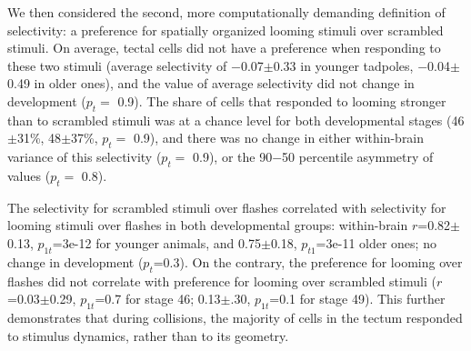 \documentclass{article}
\begin{document}
We then considered the second, more computationally demanding definition of selectivity: a preference for spatially organized looming stimuli over scrambled stimuli. On average, tectal cells did not have a preference when responding to these two stimuli (average selectivity of $-$0.07$\pm$0.33 in younger tadpoles, $-$0.04$\pm$0.49 in older ones), and the value of average selectivity did not change in development ($p_t=$ 0.9). The share of cells that responded to looming stronger than to scrambled stimuli was at a chance level for both developmental stages (46$\pm$31\%, 48$\pm$37\%, $p_t=$ 0.9), and there was no change in either within-brain variance of this selectivity ($p_t=$ 0.9), or the 90$-$50 percentile asymmetry of values ($p_t=$ 0.8).

The selectivity for scrambled stimuli over flashes correlated with selectivity for looming stimuli over flashes in both developmental groups: within-brain $r$=0.82$\pm$0.13, $p_{1t}$=3e-12 for younger animals, and 0.75$\pm$0.18, $p_{t1}$=3e-11 older ones; no change in development ($p_t$=0.3). On the contrary, the preference for looming over flashes did not correlate with preference for looming over scrambled stimuli ($r$=0.03$\pm$0.29, $p_{1t}$=0.7 for stage 46; 0.13$\pm$.30, $p_{1t}$=0.1 for stage 49). This further demonstrates that during collisions, the majority of cells in the tectum responded to stimulus dynamics, rather than to its geometry.
\end{document}
